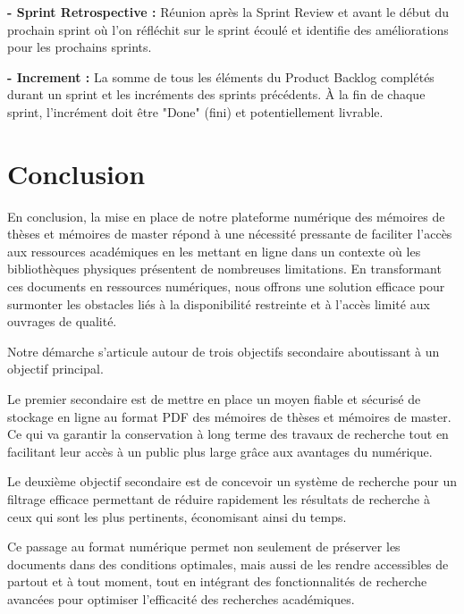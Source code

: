  \textbf{- Sprint Retrospective :} Réunion après la Sprint Review et avant le début du prochain sprint où l'on réfléchit sur le sprint écoulé et identifie des améliorations pour les prochains sprints.
 \par 
 
 \textbf{- Increment  :}  La somme de tous les éléments du Product Backlog complétés durant un sprint et les incréments des sprints précédents. À la fin de chaque sprint, l'incrément doit être "Done" (fini) et potentiellement livrable.
 \par  
 

\section*{Conclusion}

En conclusion, la mise en place de notre plateforme numérique des mémoires de thèses et mémoires de master répond à une nécessité pressante de faciliter l'accès aux ressources académiques en les mettant en ligne dans un contexte où les bibliothèques physiques présentent de nombreuses limitations. En transformant ces documents en ressources numériques, nous offrons une solution efficace pour surmonter les obstacles liés à la disponibilité restreinte et à l'accès limité aux ouvrages de qualité.\par

Notre démarche s'articule autour de trois objectifs secondaire aboutissant à un objectif principal. \par 

 Le premier secondaire est de mettre en place un moyen fiable et sécurisé de stockage en ligne au format PDF des mémoires de thèses et mémoires de master. Ce qui va garantir la conservation à long terme des travaux de recherche tout en facilitant leur accès à un public plus large grâce aux avantages du numérique.\par 

Le deuxième objectif secondaire est de concevoir un système de recherche pour un filtrage efficace permettant de réduire rapidement les résultats de recherche à ceux qui sont les plus pertinents, économisant ainsi du temps.
 
 Ce passage au format numérique permet non seulement de préserver les documents dans des conditions optimales, mais aussi de les rendre accessibles de partout et à tout moment, tout en intégrant des fonctionnalités de recherche avancées pour optimiser l'efficacité des recherches académiques.\par

